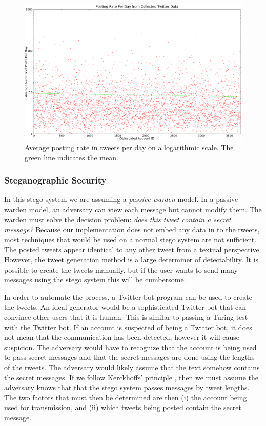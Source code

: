 \begin{figure}
    \centering
    \includegraphics[width=\columnwidth]{posting-rate.eps}
    \caption{Average posting rate in tweets per day on a logarithmic scale.  The green line indicates the mean.}
    \label{fig:evaluation:twittercc:capacity:posting-rate}
\end{figure}

\subsubsection{Steganographic Security}
\label{subsec:evaluation:twittercc:security}

In this stego system we are assuming a \emph{passive warden} model.  In a passive
warden model, an adversary can view each message but cannot modify them.  
The warden must solve the decision problem:
\emph{does this tweet contain a secret message?}  Because our implementation does
not embed any data in to the tweets, most techniques that would be used on a
normal stego system are not sufficient.  The posted tweets appear identical to
any other tweet from a textual perspective.  However, the tweet generation method
is a large determiner of detectability.  It is possible to create the tweets
manually, but if the user wants to send many messages using the stego system
this will be cumbersome.

In order to automate the process, a Twitter bot
program can be used to create the tweets.  An ideal generator would be a
sophisticated Twitter bot that can convince other users that it is human.  This
is similar to passing a Turing test with the Twitter bot.  If an account is
suspected of being a Twitter bot, it does not mean that the communication
has been detected, however it will cause suspicion.  The adversary would have
to recognize that the account is being used to pass secret messages and that
the secret messages are done using the lengths of the tweets.  The adversary
would likely assume that the text somehow contains the secret messages.
If we follow Kerckhoffs' principle \cite{kerckhoffs}, then we must assume the
adversary knows that that the stego system passes messages by tweet lengths.
The two factors that must then be determined are then (i) the account being used for transmission, and (ii) which tweets being posted contain the secret message.


